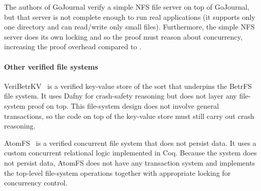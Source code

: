 The authors of GoJournal verify a simple NFS file server on top of
GoJournal, but that server is not complete enough to run real
applications (it supports only one directory and can read/write only
small files).  Furthermore, the simple NFS server does its own locking
and so the proof must reason about concurrency, increasing the proof
overhead compared to \sys.


\paragraph{Other verified file systems}



VeriBetrKV~\cite{hance:veribetrkv} is a verified key-value store of
the sort that underpins the BetrFS~\cite{jannen:betrfs} file system. It uses Dafny for
crash-safety reasoning but does not layer any file-system proof on
top. This file-system design does not involve general transactions, so
the code on top of the key-value store must still carry out crash
reasoning.

AtomFS~\cite{zou:atomfs} is a verified concurrent file system that
does not persist data. It uses a custom concurrent relational logic
implemented in Coq.  Because the system does not persist data, AtomFS
does not have any transaction system and implements the top-level
file-system operations together with appropriate locking for
concurrency control.


